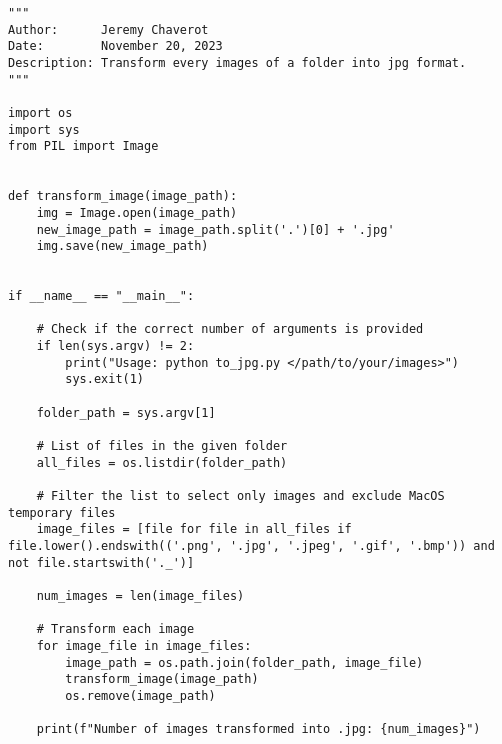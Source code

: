 \begin{lstlisting}[style=pythonstyle, label=lst:3, caption=Python script \texttt{to\_jpg.py} to transform every images of a specified folder into \texttt{jpg} format.]
"""
Author:      Jeremy Chaverot
Date:        November 20, 2023
Description: Transform every images of a folder into jpg format.
"""

import os
import sys
from PIL import Image


def transform_image(image_path):
    img = Image.open(image_path)
    new_image_path = image_path.split('.')[0] + '.jpg'
    img.save(new_image_path)


if __name__ == "__main__":

	# Check if the correct number of arguments is provided
    if len(sys.argv) != 2:
        print("Usage: python to_jpg.py </path/to/your/images>")
        sys.exit(1)

    folder_path = sys.argv[1]

    # List of files in the given folder
    all_files = os.listdir(folder_path)
    
    # Filter the list to select only images and exclude MacOS temporary files
    image_files = [file for file in all_files if file.lower().endswith(('.png', '.jpg', '.jpeg', '.gif', '.bmp')) and not file.startswith('._')]
    
    num_images = len(image_files)

    # Transform each image
    for image_file in image_files:
        image_path = os.path.join(folder_path, image_file)
        transform_image(image_path)
        os.remove(image_path)

    print(f"Number of images transformed into .jpg: {num_images}")
\end{lstlisting}


\cleardoublepage{}

